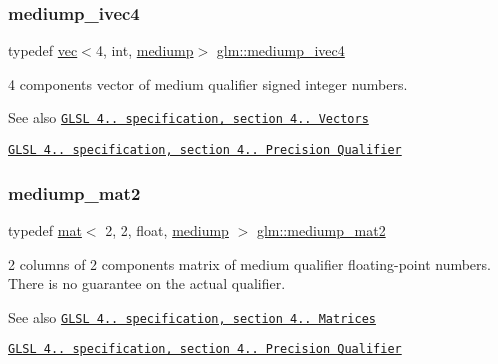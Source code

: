 \subsubsection{\texorpdfstring{mediump\+\_\+ivec4}{mediump\_ivec4}}
{\footnotesize\ttfamily typedef \hyperlink{structglm_1_1vec}{vec}$<$4, int, \hyperlink{namespaceglm_a36ed105b07c7746804d7fdc7cc90ff25a6416f3ea0c9025fb21ed50c4d6620482}{mediump}$>$ \hyperlink{group__core__precision_gada31c3570b58a80e616c7245726a210d}{glm\+::mediump\+\_\+ivec4}}

4 components vector of medium qualifier signed integer numbers.

\begin{DoxySeeAlso}{See also}
\href{http://www.opengl.org/registry/doc/GLSLangSpec.4.20.8.pdf}{\tt G\+L\+SL 4.. specification, section 4.. Vectors} 

\href{http://www.opengl.org/registry/doc/GLSLangSpec.4.20.8.pdf}{\tt G\+L\+SL 4.. specification, section 4.. Precision Qualifier} 
\end{DoxySeeAlso}
\mbox{\label{group__core__precision_ga698131fdb127cb55e8b70cc1b2c4ff67}} 
\subsubsection{\texorpdfstring{mediump\+\_\+mat2}{mediump\_mat2}}
{\footnotesize\ttfamily typedef \hyperlink{structglm_1_1mat}{mat}$<$ 2, 2, float, \hyperlink{namespaceglm_a36ed105b07c7746804d7fdc7cc90ff25a6416f3ea0c9025fb21ed50c4d6620482}{mediump} $>$ \hyperlink{group__core__precision_ga698131fdb127cb55e8b70cc1b2c4ff67}{glm\+::mediump\+\_\+mat2}}

2 columns of 2 components matrix of medium qualifier floating-\/point numbers. There is no guarantee on the actual qualifier.

\begin{DoxySeeAlso}{See also}
\href{http://www.opengl.org/registry/doc/GLSLangSpec.4.20.8.pdf}{\tt G\+L\+SL 4.. specification, section 4.. Matrices} 

\href{http://www.opengl.org/registry/doc/GLSLangSpec.4.20.8.pdf}{\tt G\+L\+SL 4.. specification, section 4.. Precision Qualifier} 
\end{DoxySeeAlso}
\mbox{\label{group__core__precision_gaa7581ec892b01e6ba19c4fdbc7c60df4}} 
